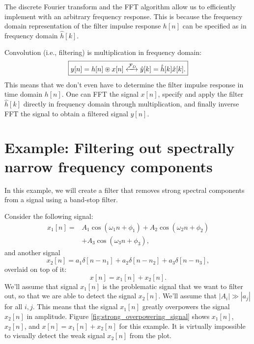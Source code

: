 The discrete Fourier transform and the FFT algorithm allow us to
efficiently implement  with an arbitrary frequency
response. This is because the frequency domain representation of the
filter impulse response $h[n]$ can be specified as in frequency domain
$\hat{h}[k]$.

Convolution (i.e., filtering) is multiplication in frequency domain:
\begin{equation}
  \boxed{
    y[n] = h[n]\circledast x[n] \xleftrightarrow{\mathcal{F}_{D}} \hat{y}[k] = \hat{h}[k]\hat{x}[k].
  }
\end{equation}
This means that we don't even have to determine the filter impulse
response in time domain $h[n]$. One can FFT the signal $x[n]$, specify and
apply the filter $\hat{h}[k]$ directly in frequency domain through
multiplication, and finally inverse FFT the signal to obtain a
filtered signal $y[n]$.

\section{Example: Filtering out spectrally narrow frequency components}

In this example, we will create a filter that removes strong spectral
components from a signal using a band-stop filter.

Consider the following signal:
\begin{align}
  x_1[n] = & A_1\cos(\omega_1 n + \phi_1) + A_2\cos(\omega_2 n + \phi_2) \\
           & + A_3\cos(\omega_3 n + \phi_3),
\end{align}
and another signal
\begin{equation}
  x_2[n] = a_1\delta[n-n_1] + a_2\delta[n - n_2] + a_3\delta[n-n_3],
\end{equation}
overlaid on top of it:
\begin{equation}
  x[n] = x_1[n] + x_2[n].
\end{equation}
We'll assume that signal $x_1[n]$ is the problematic signal that we
want to filter out, so that we are able to detect the signal
$x_2[n]$. We'll assume that $|A_i| \gg |a_j|$ for all $i,j$. This
means that the signal $x_1[n]$ greatly overpowers the signal $x_2[n]$ in
amplitude. Figure \ref{fig:strong_overpowering_signal} shows $x_1[n]$,
$x_2[n]$, and $x[n]=x_1[n]+x_2[n]$ for this example. It is virtually
impossible to visually detect the weak signal $x_2[n]$ from the plot.

